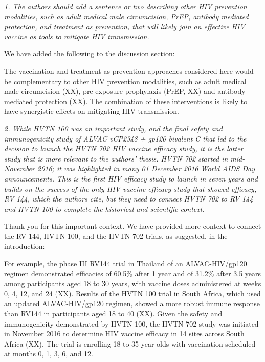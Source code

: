 \documentclass[12pt]{jpmletter}
\newenvironment{original}{\it}{}
\begin{document}
\begin{letter}{}
\begin{original}
      1. The authors should add a sentence or two describing other HIV
      prevention modalities, such as adult medical male circumcision,
      PrEP, antibody mediated protection, and treatment as prevention,
      that will likely join an effective HIV vaccine as tools to
      mitigate HIV transmission.
    \end{original}

    We have added the following to the discussion section:
    \begin{quoting}
      The vaccination and treatment as prevention approaches
      considered here would be complementary to other HIV prevention
      modalities, such as adult medical male circumcision (XX),
      pre-exposure prophylaxis (PrEP, XX) and antibody-mediated
      protection (XX). The combination of these interventions is
      likely to have synergistic effects on mitigating HIV
      transmission.
    \end{quoting}
    
    \begin{original}
      2. While HVTN 100 was an important study, and the final safety
      and immunogenicity study of ALVAC vCP2348 + gp120 bivalent C
      that led to the decision to launch the HVTN 702 HIV vaccine
      efficacy study, it is the latter study that is more relevant to
      the authors' thesis. HVTN 702 started in mid-November 2016; it
      was highlighted in many 01 December 2016 World AIDS Day
      announcements. This is the first HIV efficacy study to launch in
      seven years and builds on the success of the only HIV vaccine
      efficacy study that showed efficacy, RV 144, which the authors
      cite, but they need to connect HVTN 702 to RV 144 and HVTN 100
      to complete the historical and scientific context.
    \end{original}
    
    Thank you for this important context.  We have provided more
    context to connect the RV 144, HVTN 100, and the HVTN 702 trials,
    as suggested, in the introduction:
    \begin{quoting}
      For example, the phase III RV144 trial in Thailand of an
      ALVAC-HIV/gp120 regimen demonstrated efficacies of 60.5\% after
      1 year and of 31.2\% after 3.5 years among participants aged 18
      to 30 years, with vaccine doses administered at weeks 0, 4, 12,
      and 24 (XX). Results of the HVTN 100 trial in South Africa,
      which used an updated ALVAC-HIV/gp120 regimen, showed a more
      robust immune response than RV144 in participants aged 18 to 40
      (XX).  Given the safety and immunogenicity demonstrated by HVTN
      100, the HVTN 702 study was initiated in November 2016 to
      determine HIV vaccine efficacy in 14 sites across South Africa
      (XX). The trial is enrolling 18 to 35 year olds with vaccination
      scheduled at months 0, 1, 3, 6, and 12.
    \end{quoting}


\end{letter}
\end{document}
